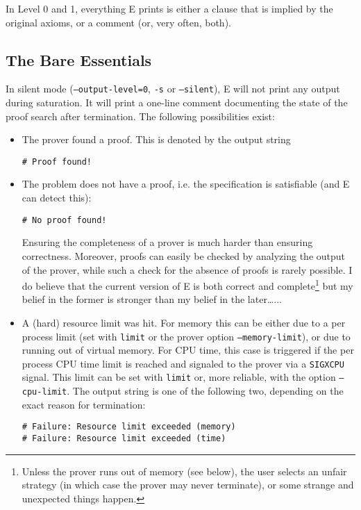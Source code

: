\documentclass{article}
\begin{document}
In Level 0 and 1, everything E prints is either a clause that is
implied by the original axioms, or a comment (or, very often, both).


\subsection{The Bare Essentials}
\label{sec:output:essentials}

In silent mode (\texttt{--output-level=0}, \texttt{-s} or
\texttt{--silent}), E will not print any output during saturation. It
will print a one-line comment documenting the state of the proof
search after termination. The following possibilities exist:

\begin{itemize}
\item The prover found a proof. This is denoted by the output string
\begin{verbatim}
# Proof found!
\end{verbatim}
\item The problem does not have a proof, i.e. the specification is
  satisfiable (and E can detect this):
\begin{verbatim}
# No proof found!
\end{verbatim}
  Ensuring the completeness of a prover is much harder than ensuring
  correctness. Moreover, proofs can easily be checked by analyzing the
  output of the prover, while such a check for the absence of proofs
  is rarely possible. I do believe that the current version of E is
  both correct and complete\footnote{Unless the prover runs out of
    memory (see below), the user selects an unfair strategy (in which
    case the prover may never terminate), or some strange and
    unexpected things happen.} but my belief in the former is stronger
  than my belief in the later\ldots...
\item A (hard) resource limit was hit. For memory this can be either
  due to a per process limit (set with \texttt{limit} or the prover
  option \texttt{--memory-limit}), or due to running out of virtual
  memory. For CPU time, this case is triggered if the per process CPU
  time limit is reached and signaled to the prover via a
  \texttt{SIGXCPU} signal. This limit can be set with \texttt{limit}
  or, more reliable, with the option \texttt{--cpu-limit}. The output
  string is one of the following two, depending on the exact reason
  for termination:
\begin{verbatim}
# Failure: Resource limit exceeded (memory)
# Failure: Resource limit exceeded (time)

\end{verbatim}
\end{itemize}
\end{document}
